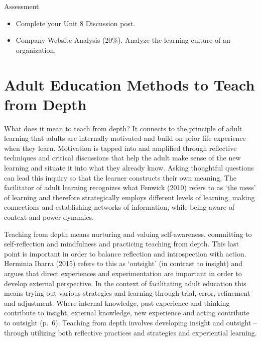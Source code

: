 \documentclass[
]{book}
\providecommand{\tightlist}{%
  \setlength{\itemsep}{0pt}\setlength{\parskip}{0pt}}
\begin{document}
\begin{assessment}
{Assessment}

\begin{itemize}
\tightlist
\item
  Complete your Unit 8 Discussion post.\\
\item
  Company Website Analysis (20\%). Analyze the learning culture of an
  organization.
\end{itemize}
\end{assessment}

\hypertarget{adult-education-methods-to-teach-from-depth}{%
\section{Adult Education Methods to Teach from Depth}\label{adult-education-methods-to-teach-from-depth}}

What does it mean to teach from depth? It connects to the principle of
adult learning that adults are internally motivated and build on prior
life experience when they learn. Motivation is tapped into and amplified
through reflective techniques and critical discussions that help the
adult make sense of the new learning and situate it into what they
already know. Asking thoughtful questions can lead this inquiry so that
the learner constructs their own meaning. The facilitator of adult
learning recognizes what Fenwick (2010) refers to as `the mess' of
learning and therefore strategically employs different levels of
learning, making connections and establishing networks of information,
while being aware of context and power dynamics.

Teaching from depth means nurturing and valuing self-awareness,
committing to self-reflection and mindfulness and practicing teaching
from depth. This last point is important in order to balance reflection
and introspection with action. Herminia Ibarra (2015) refers to this as
`outsight' (in contrast to insight) and argues that direct experiences
and experimentation are important in order to develop external
perspective. In the context of facilitating adult education this means
trying out various strategies and learning through trial, error,
refinement and adjustment. Where internal knowledge, past experience and
thinking contribute to insight, external knowledge, new experience and
acting contribute to outsight (p.~6). Teaching from depth involves
developing insight and outsight -- through utilizing both reflective
practices and strategies and experiential learning.
\end{document}
